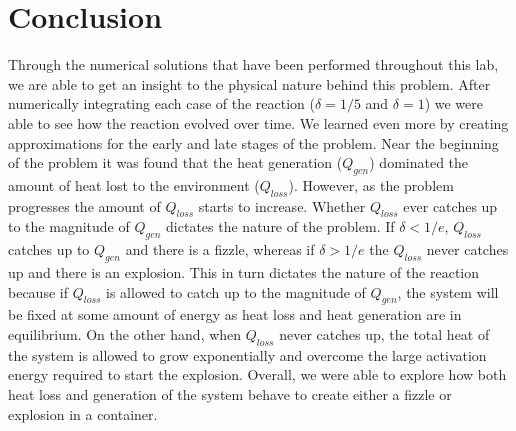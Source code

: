 \documentclass[12pt]{article}\pagestyle{myheadings}
\theoremstyle{plain}
\begin{document}
\section{Conclusion}
Through the numerical solutions that have been performed throughout this lab, we are able to get an insight to the physical nature behind this problem. After numerically integrating each case of the reaction ($\delta = 1/5$ and $\delta = 1$) we were able to see how the reaction evolved over time. We learned even more by creating approximations for the early and late stages of the problem. Near the beginning of the problem it was found that the heat generation ($Q_{gen}$) dominated the amount of heat lost to the environment ($Q_{loss}$). However, as the problem progresses the amount of $Q_{loss}$ starts to increase. Whether $Q_{loss}$ ever catches up to the magnitude of $Q_{gen}$ dictates the nature of the problem. If $\delta < 1/e$, $Q_{loss}$ catches up to $Q_{gen}$ and there is a fizzle, whereas if $\delta > 1/e$ the $Q_{loss}$ never catches up and there is an explosion. This in turn dictates the nature of the reaction because if $Q_{loss}$ is allowed to catch up to the magnitude of $Q_{gen}$, the system will be fixed at some amount of energy as heat loss and heat generation are in equilibrium. On the other hand, when $Q_{loss}$ never catches up, the total heat of the system is allowed to grow exponentially and overcome the large activation energy required to start the explosion. Overall, we were able to explore how both heat loss and generation of the system behave to create either a fizzle or explosion in a container.
\end{document}

